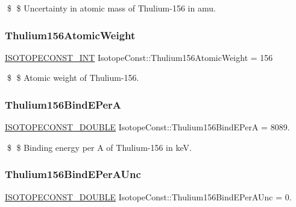 \$ \$ Uncertainty in atomic mass of Thulium-\/156 in amu. \mbox{\label{group___isotope_const-_thulium-_tm156_gad277a1224bdedde6f996a6e494384a5d}} 
\subsubsection{\texorpdfstring{Thulium156\+Atomic\+Weight}{Thulium156AtomicWeight}}
{\footnotesize\ttfamily \mbox{\hyperlink{group___isotope_const-_macros_ga5f18360b3e99483a35c32d789e62621c}{I\+S\+O\+T\+O\+P\+E\+C\+O\+N\+S\+T\+\_\+\+I\+NT}} Isotope\+Const\+::\+Thulium156\+Atomic\+Weight = 156}

\$ \$ Atomic weight of Thulium-\/156. \mbox{\label{group___isotope_const-_thulium-_tm156_gaebb98bd2d40444289863a63fdc314a51}} 
\subsubsection{\texorpdfstring{Thulium156\+Bind\+E\+PerA}{Thulium156BindEPerA}}
{\footnotesize\ttfamily \mbox{\hyperlink{group___isotope_const-_macros_ga8f45a7272ce02c0b4c65c44636ed719a}{I\+S\+O\+T\+O\+P\+E\+C\+O\+N\+S\+T\+\_\+\+D\+O\+U\+B\+LE}} Isotope\+Const\+::\+Thulium156\+Bind\+E\+PerA = 8089.}

\$ \$ Binding energy per A of Thulium-\/156 in keV. \mbox{\label{group___isotope_const-_thulium-_tm156_ga99e43807222c2a6bcb9b284035b728b2}} 
\subsubsection{\texorpdfstring{Thulium156\+Bind\+E\+Per\+A\+Unc}{Thulium156BindEPerAUnc}}
{\footnotesize\ttfamily \mbox{\hyperlink{group___isotope_const-_macros_ga8f45a7272ce02c0b4c65c44636ed719a}{I\+S\+O\+T\+O\+P\+E\+C\+O\+N\+S\+T\+\_\+\+D\+O\+U\+B\+LE}} Isotope\+Const\+::\+Thulium156\+Bind\+E\+Per\+A\+Unc = 0.}

